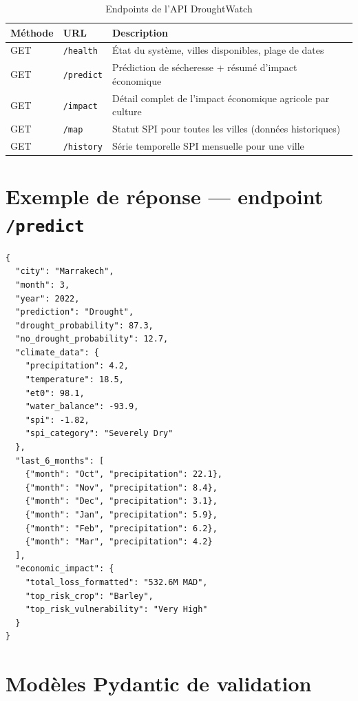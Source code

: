 \documentclass[12pt,a4paper]{report}
\begin{document}
\begin{table}[H]
    \centering
    \begin{tabular}{p{2cm}p{5cm}p{6cm}}
        \toprule
        Méthode & URL & Description \\
        \midrule
        GET & \texttt{/health} & État du système, villes disponibles, plage de dates \\
        GET & \texttt{/predict} & Prédiction de sécheresse + résumé d'impact économique \\
        GET & \texttt{/impact} & Détail complet de l'impact économique agricole par culture \\
        GET & \texttt{/map} & Statut SPI pour toutes les villes (données historiques) \\
        GET & \texttt{/history} & Série temporelle SPI mensuelle pour une ville \\
        \bottomrule
    \end{tabular}
    \caption{Endpoints de l'API DroughtWatch}
\end{table}

\section{Exemple de réponse — endpoint \texttt{/predict}}

\begin{lstlisting}[style=jsonStyle, caption={Réponse JSON de GET /predict?city=Marrakech\&month=3\&year=2022}]
{
  "city": "Marrakech",
  "month": 3,
  "year": 2022,
  "prediction": "Drought",
  "drought_probability": 87.3,
  "no_drought_probability": 12.7,
  "climate_data": {
    "precipitation": 4.2,
    "temperature": 18.5,
    "et0": 98.1,
    "water_balance": -93.9,
    "spi": -1.82,
    "spi_category": "Severely Dry"
  },
  "last_6_months": [
    {"month": "Oct", "precipitation": 22.1},
    {"month": "Nov", "precipitation": 8.4},
    {"month": "Dec", "precipitation": 3.1},
    {"month": "Jan", "precipitation": 5.9},
    {"month": "Feb", "precipitation": 6.2},
    {"month": "Mar", "precipitation": 4.2}
  ],
  "economic_impact": {
    "total_loss_formatted": "532.6M MAD",
    "top_risk_crop": "Barley",
    "top_risk_vulnerability": "Very High"
  }
}
\end{lstlisting}

\section{Modèles Pydantic de validation}
\end{document}
